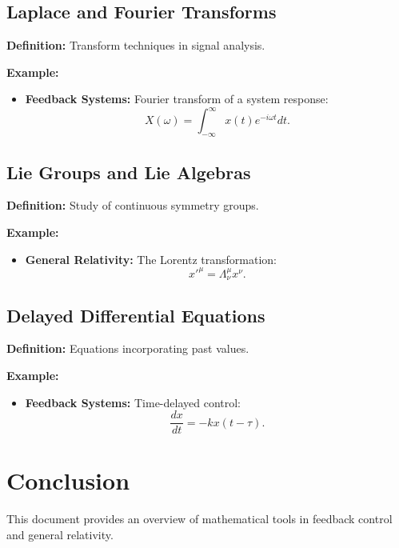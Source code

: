 \subsection{Laplace and Fourier Transforms}
\textbf{Definition:} Transform techniques in signal analysis.

\textbf{Example:}
\begin{itemize}
    \item \textbf{Feedback Systems:} Fourier transform of a system response:
    \[
    X(\omega) = \int_{-\infty}^{\infty} x(t) e^{-i\omega t} dt.
    \]
\end{itemize}

\subsection{Lie Groups and Lie Algebras}
\textbf{Definition:} Study of continuous symmetry groups.

\textbf{Example:}
\begin{itemize}
    \item \textbf{General Relativity:} The Lorentz transformation:
    \[
    x'^\mu = \Lambda^\mu_{\nu} x^\nu.
    \]
\end{itemize}

\subsection{Delayed Differential Equations}
\textbf{Definition:} Equations incorporating past values.

\textbf{Example:}
\begin{itemize}
    \item \textbf{Feedback Systems:} Time-delayed control:
    \[
    \frac{dx}{dt} = -k x(t - \tau).
    \]
\end{itemize}

\section{Conclusion}
This document provides an overview of mathematical tools in feedback control and general relativity.

